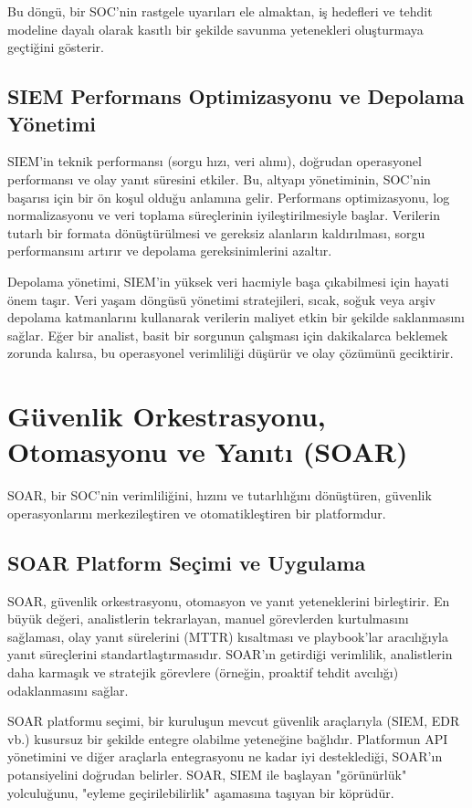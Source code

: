 Bu döngü, bir SOC'nin rastgele uyarıları ele almaktan, iş hedefleri ve tehdit modeline dayalı olarak kasıtlı bir şekilde savunma yetenekleri oluşturmaya geçtiğini gösterir.

\subsection{SIEM Performans Optimizasyonu ve Depolama Yönetimi}

SIEM'in teknik performansı (sorgu hızı, veri alımı), doğrudan operasyonel performansı ve olay yanıt süresini etkiler. Bu, altyapı yönetiminin, SOC'nin başarısı için bir ön koşul olduğu anlamına gelir. Performans optimizasyonu, log normalizasyonu ve veri toplama süreçlerinin iyileştirilmesiyle başlar. Verilerin tutarlı bir formata dönüştürülmesi ve gereksiz alanların kaldırılması, sorgu performansını artırır ve depolama gereksinimlerini azaltır.

Depolama yönetimi, SIEM'in yüksek veri hacmiyle başa çıkabilmesi için hayati önem taşır. Veri yaşam döngüsü yönetimi stratejileri, sıcak, soğuk veya arşiv depolama katmanlarını kullanarak verilerin maliyet etkin bir şekilde saklanmasını sağlar. Eğer bir analist, basit bir sorgunun çalışması için dakikalarca beklemek zorunda kalırsa, bu operasyonel verimliliği düşürür ve olay çözümünü geciktirir.

\section{Güvenlik Orkestrasyonu, Otomasyonu ve Yanıtı (SOAR)}

SOAR, bir SOC'nin verimliliğini, hızını ve tutarlılığını dönüştüren, güvenlik operasyonlarını merkezileştiren ve otomatikleştiren bir platformdur.

\subsection{SOAR Platform Seçimi ve Uygulama}

SOAR, güvenlik orkestrasyonu, otomasyon ve yanıt yeteneklerini birleştirir. En büyük değeri, analistlerin tekrarlayan, manuel görevlerden kurtulmasını sağlaması, olay yanıt sürelerini (MTTR) kısaltması ve playbook'lar aracılığıyla yanıt süreçlerini standartlaştırmasıdır. SOAR'ın getirdiği verimlilik, analistlerin daha karmaşık ve stratejik görevlere (örneğin, proaktif tehdit avcılığı) odaklanmasını sağlar.

SOAR platformu seçimi, bir kuruluşun mevcut güvenlik araçlarıyla (SIEM, EDR vb.) kusursuz bir şekilde entegre olabilme yeteneğine bağlıdır. Platformun API yönetimini ve diğer araçlarla entegrasyonu ne kadar iyi desteklediği, SOAR'ın potansiyelini doğrudan belirler. SOAR, SIEM ile başlayan "görünürlük" yolculuğunu, "eyleme geçirilebilirlik" aşamasına taşıyan bir köprüdür.

